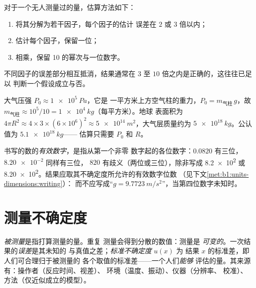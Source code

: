 \begin{method}[估算]\label{met:b1:units-dimensions:estimate}
对于一个无人测量过的量，估算方法如下：
\begin{enumerate}
  \item 将其分解为若干因子，每个因子的估计
        误差在 $2$ 或 $3$ 倍以内；
  \item 估计每个因子，保留一位；
  \item 相乘，保留 10 的幂次与一位数字。
\end{enumerate}
不同因子的误差部分相互抵消，结果通常在
$3$ 至 $10$ 倍之内是正确的，这往往已足以
判断一个假设成立与否。
\end{method}

\begin{example}[大气层的质量]\label{ex:b1:units-dimensions:atmosphere}
大气压强 $P_0 \approx \qty{1e5}{Pa}$，它是
一平方米上方空气柱的重力，$P_0 = m_{\text{气柱}}\,g$，故
$m_{\text{气柱}} \approx 10^5/10 = \qty{1e4}{kg}$（每平方米）。地球
表面积为 $4\pi R^2 \approx 4 \times 3 \times (6\times10^6)^2
\approx \qty{5e14}{m^2}$，大气层质量约为
$\qty{5e18}{kg}$。公认值为 $\qty{5.1e18}{kg}$——
估算只需要 $P_0$ 和 $R$。
\end{example}

\begin{definition}[有效数字]\label{def:b1:units-dimensions:sigfig}
书写的数的\emph{有效数字}，是指从第一个非零
数字起的各位数字：$0.0820$ 有三位，$\num{8.20e-2}$ 同样有三位，
$820$ 有歧义（两位或三位），除非写成 \num{8.2e2} 或
\num{8.20e2}。结果应取其不确定度所允许的有效数字位数
（见下文\cref{met:b1:units-dimensions:writing}）：
而不应写成“$g = \qty{9.7723}{m/s^2}$”，当第四位数字未知时。
\end{definition}

\section{测量不确定度}

\begin{definition}\label{def:b1:units-dimensions:uncertainty}
\emph{被测量}是指打算测量的量。重复
测量会得到分散的数值：测量是
\emph{可变的}。一次结果的\emph{误差}是其未知的
与真值之差；\emph{标准不确定度} $u(x)$ 为
结果 $x$ 的标准差，即人们可合理归于被测量的
各个取值的标准差——一个人们\emph{能够}
评估的量。其来源有：操作者（反应时间、视差）、
环境（温度、振动）、仪器（分辨率、
校准）、方法（仅近似成立的模型）。
\end{definition}


